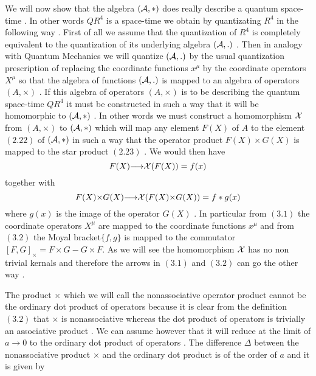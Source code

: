 \documentclass[a4paper,12pt]{article}
\let\oldtheequation=\theequation
\def\doteqs#1{\setcounter{equation}{0}
            \def\theequation{{#1}.\oldtheequation}}
\newcounter{sxn}
\def\sx#1{\addtocounter{sxn}{1}
\medskip \goodbreak
\noindent{\large\bf
\centerline{\thesxn.~~#1}} \nobreak \medskip}
\def\sxn#1{\sx{#1} \doteqs{\thesxn}}
\begin{document}
 \vskip 5mm \sxn{Quantum Space-Time}
\vskip 5mm  \vskip 5mm \noindent
We will now show that the algebra $({\cal A},*)$ does really
describe a quantum space-time . In other words $QR^4$ is a
space-time we obtain by quantizating $R^4$ in the following way .
First of all we assume that the quantization of $R^4$ is
completely equivalent to the quantization of its underlying
algebra $({\cal A},.)$ \cite{madore,landi}. Then in analogy with
Quantum Mechanics we will quantize $({\cal A},.)$ by the usual
quantization prescription of replacing the coordinate functions
$x^{\mu}$ by the coordinate operators $X^{\mu}$ so that the
algebra of functions $({\cal A},.)$ is mapped to an algebra of
operators $(A,{\times})$ \cite{dop}. If this algebra of operators
$(A,\times)$ is to be describing the quantum space-time $QR^4$ it
must be constructed in such a way that it will be homomorphic to
$({\cal A},*)$ . In other words we must construct a homomorphism
${\cal X}$ from $(A,\times)$ to $({\cal A},*)$ which will map any
element $F(X)$ of $A$ to the element $(2.22)$ of $({\cal A},*)$ in
such a way that the operator product $F(X){\times}G(X)$ is mapped
to the star product $(2.23)$ . We would then have
\begin{equation}
F(X){\longrightarrow}{\cal X}(F(X))=f(x)
\end{equation}
together with
\begin{equation}
F(X){\times}G(X){\longrightarrow}{\cal X}(F(X){\times}G(X))=f*g(x)
\end{equation}
where $g(x)$ is the image of the operator $G(X)$ . In particular
from $(3.1)$ the coordinate operators $X^{\mu}$ are mapped to the
coordinate functions $x^{\mu}$ and from $(3.2)$ the Moyal
bracket$\{f,g\}$ is mapped to the commutator
$[F,G]_{\times}=F{\times}G-G{\times}F$\cite{merkulov}. As we will
see the homomorphism ${\cal X}$ has no non trivial kernals and
therefore the arrows in $(3.1)$ and $(3.2)$ can go the other way .

The product ${\times}$ which we will call the nonassociative
operator product cannot be the ordinary dot product of operators
because it is clear from the definition $(3.2)$ that $\times$ is
nonassociative whereas the dot product of operators is trivially
an associative product . We can assume however that it will reduce
at the limit of $a{\longrightarrow}0$ to the ordinary dot product
of operators . The difference ${\Delta}$ between the
nonassociative product ${\times}$ and the ordinary dot product is
of the order of $a$ and it is given by
\end{document}
